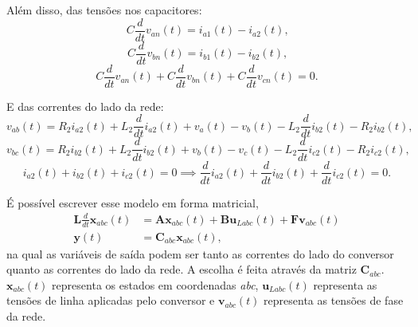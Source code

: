     Além disso, das tensões nos capacitores:
    \begin{equation}
        C \frac{d}{dt} v_{an}(t) = i_{a1}(t) - i_{a2}(t) \text{,}
    \end{equation}
    \begin{equation}
        C \frac{d}{dt} v_{bn}(t) = i_{b1}(t) - i_{b2}(t) \text{,}
    \end{equation}
    \begin{equation}
        C \frac{d}{dt} v_{an}(t) + C \frac{d}{dt} v_{bn}(t) +
            C \frac{d}{dt} v_{cn}(t) = 0 \text{.}
    \end{equation}

    E das correntes do lado da rede:
    \begin{equation}
        v_{ab}(t) = R_2 i_{a2}(t) + L_2 \frac{d}{dt} i_{a2}(t) + v_a(t) - v_b(t)
            - L_2 \frac{d}{dt} i_{b2}(t) - R_2 i_{b2}(t) \text{,}
    \end{equation}
    \begin{equation}
        v_{bc}(t) = R_2 i_{b2}(t) + L_2 \frac{d}{dt} i_{b2}(t) + v_b(t) - v_c(t)
            - L_2 \frac{d}{dt} i_{c2}(t) - R_2 i_{c2}(t) \text{,}
    \end{equation}
    \begin{equation}
        i_{a2}(t) + i_{b2}(t) + i_{c2}(t) = 0 \implies \frac{d}{dt} i_{a2}(t) +
            \frac{d}{dt} i_{b2}(t) + \frac{d}{dt} i_{c2}(t) = 0 \text{.}
    \end{equation}

    É possível escrever esse modelo em forma matricial,
    \begin{equation}
        \begin{split}
            \mathbf{L} \frac{d}{dt} \mathbf{x}_{abc}(t) & = \mathbf{Ax}_{abc}(t) +
                \mathbf{Bu}_{Labc}(t) + \mathbf{Fv}_{abc}(t) \\
            \mathbf{y}(t) & = \mathbf{C}_{abc} \mathbf{x}_{abc}(t) \text{,}
        \end{split}
    \end{equation}
    na qual as variáveis de saída podem ser tanto as correntes do lado do conversor quanto as correntes do lado da rede. A escolha é feita através da matriz $\mathbf{C}_{abc}$. $\mathbf{x}_{abc}(t)$ representa os estados em coordenadas \emph{abc}, $\mathbf{u}_{Labc}(t)$ representa as tensões de linha aplicadas pelo conversor e $\mathbf{v}_{abc}(t)$ representa as tensões de fase da rede.

